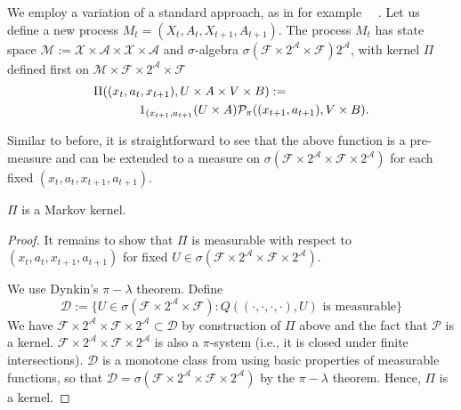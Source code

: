 \begin{appendices}
We employ a variation of a standard approach, as in for example ~\citeauthor{tsitsiklis1999average}~. Let us define a new process $M_t = (X_t, A_t, X_{t + 1}, A_{t + 1})$. The process $M_t$ has state space $\mathcal{M} := \mathcal{X} \times \mathcal{A} \times \mathcal{X} \times \mathcal{A}$ and $\sigma$-algebra $\sigma(\mathcal{F} \times 2^\mathcal{A} \times \mathcal{F}) 2^\mathcal{A}$, with kernel $\Pi$ defined first on $\mathcal{M} \times \mathcal{F} \times 2^\mathcal{A} \times \mathcal{F}$
\begin{align*}
    \Pi((x_t, a_t, x_{t + 1})&, U \times A \times V \times B) :=\\
    &\hspace{-1cm} 1_{(x_{t + 1}, a_{t + 1}}(U \times A) \mathcal{P}_\pi((x_{t + 1}, a_{t + 1}), V \times B).\nonumber
\end{align*}

\noindent Similar to before, it is straightforward to see that the above function is a pre-measure and can be extended to a measure on $\sigma(\mathcal{F} \times 2^\mathcal{A} \times \mathcal{F} \times 2^\mathcal{A})$ for each fixed $(x_t, a_t, x_{t + 1}, a_{t + 1})$.

\begin{lemma}
$\Pi$ is a Markov kernel.
\end{lemma}
\begin{proof}
It remains to show that $\Pi$ is measurable with respect to $(x_t, a_t, x_{t + 1}, a_{t + 1})$ for fixed $U \in \sigma(\mathcal{F} \times 2^\mathcal{A} \times \mathcal{F} \times 2^\mathcal{A})$.

We use Dynkin's $\pi-\lambda$ theorem. Define
\begin{equation*}
 \mathcal{D} := \{U \in \sigma(\mathcal{F} \times 2^\mathcal{A} \times \mathcal{F}) : Q((\cdot, \cdot, \cdot, \cdot), U) \text{ is measurable}\}
\end{equation*}
We have $\mathcal{F} \times 2^\mathcal{A} \times \mathcal{F} \times 2^\mathcal{A} \subset \mathcal{D}$ by construction of $\Pi$ above and the fact that $\mathcal{P}$ is a kernel. $\mathcal{F} \times 2^\mathcal{A} \times \mathcal{F} \times 2^\mathcal{A}$ is also a $\pi$-system (i.e., it is closed under finite intersections). $\mathcal{D}$ is a monotone class from using basic properties of measurable functions, so that $\mathcal{D} = \sigma(\mathcal{F} \times 2^\mathcal{A} \times \mathcal{F} \times 2^\mathcal{A})$ by the $\pi-\lambda$ theorem. Hence, $\Pi$ is a kernel.
\end{proof}


\end{appendices}
